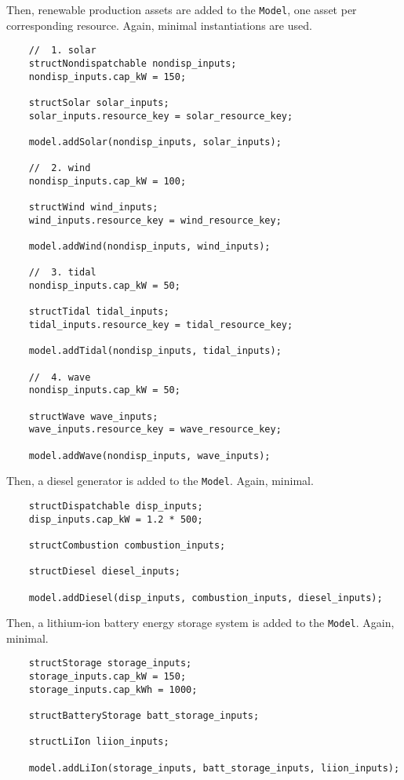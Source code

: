 \documentclass[12pt, letterpaper]{report}
\begin{document}
\noindent Then, renewable production assets are added to the \texttt{Model}, one asset per corresponding resource. Again, minimal instantiations are used.

\newpage 
\begin{verbatim}
    //  1. solar
    structNondispatchable nondisp_inputs;
    nondisp_inputs.cap_kW = 150;
    
    structSolar solar_inputs;
    solar_inputs.resource_key = solar_resource_key;
    
    model.addSolar(nondisp_inputs, solar_inputs);
    
    //  2. wind
    nondisp_inputs.cap_kW = 100;
    
    structWind wind_inputs;
    wind_inputs.resource_key = wind_resource_key;
    
    model.addWind(nondisp_inputs, wind_inputs);
    
    //  3. tidal
    nondisp_inputs.cap_kW = 50;
    
    structTidal tidal_inputs;
    tidal_inputs.resource_key = tidal_resource_key;
    
    model.addTidal(nondisp_inputs, tidal_inputs);
    
    //  4. wave
    nondisp_inputs.cap_kW = 50;
    
    structWave wave_inputs;
    wave_inputs.resource_key = wave_resource_key;
    
    model.addWave(nondisp_inputs, wave_inputs);
\end{verbatim}

\noindent Then, a diesel generator is added to the \texttt{Model}. Again, minimal.

\begin{verbatim}
    structDispatchable disp_inputs;
    disp_inputs.cap_kW = 1.2 * 500;
    
    structCombustion combustion_inputs;
    
    structDiesel diesel_inputs;
    
    model.addDiesel(disp_inputs, combustion_inputs, diesel_inputs);
\end{verbatim}

\noindent Then, a lithium-ion battery energy storage system is added to the \texttt{Model}. Again, minimal.

\begin{verbatim}
    structStorage storage_inputs;
    storage_inputs.cap_kW = 150;
    storage_inputs.cap_kWh = 1000;
    
    structBatteryStorage batt_storage_inputs;
    
    structLiIon liion_inputs;
    
    model.addLiIon(storage_inputs, batt_storage_inputs, liion_inputs);
\end{verbatim}
\end{document}
